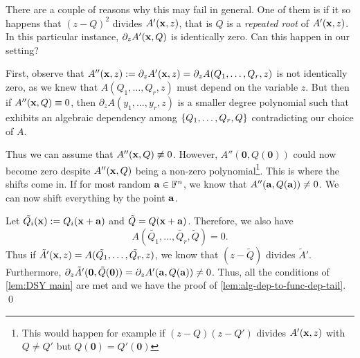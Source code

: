 There are a couple of reasons why this may fail in general.
One of them is if it so happens that $(z-Q)^2$ divides $A'(\mathbf{x}, z)$, that is $Q$ is a \emph{repeated root} of $A'(\mathbf{x}, z)$. In this particular instance, $\partial_z A'(\mathbf{x}, Q)$ is identically zero. Can this happen in our setting? 

First, observe that $A''(\mathbf{x}, z) := \partial_z A'(\mathbf{x}, z) = \partial_z A(Q_1,\ldots, Q_r,z)$ is not identically zero, as we knew that $A(Q_1,\ldots, Q_r,z)$ must depend on the variable $z$. But then if $A''(\mathbf{x}, Q) \equiv 0$, then $\partial_z A(y_1,\ldots, y_r, z)$ is a smaller degree polynomial such that exhibits an algebraic dependency among $\left\{Q_1,\ldots, Q_r, Q\right\}$ contradicting our choice of $A$. 

Thus we can assume that $A''(\mathbf{x}, Q) \not\equiv 0$. However, $A''(\mathbf{0}, Q(\mathbf{0}))$ could now become zero despite $A''(\mathbf{x}, Q)$ being a non-zero polynomial\footnote{This would happen for example if $(z - Q)(z - Q')$ divides $A'(\mathbf{x}, z)$ with $Q \neq Q'$ but $Q(\mathbf{0}) = Q'(\mathbf{0})$}. This is where the shifts come in. If for most random $\mathbf{a} \in \mathbb{F}^n$, we know that $A''(\mathbf{a}, Q(\mathbf{a})) \neq 0$. We can now shift everything by the point $\mathbf{a}$. 

Let $\tilde{Q_i}(\mathbf{x}) := Q_i(\mathbf{x} + \mathbf{a})$ and $\tilde{Q} = Q(\mathbf{x} + \mathbf{a})$. Therefore, we also have
\[
A(\tilde{Q_1}, \ldots, \tilde{Q_r}, \tilde{Q}) = 0.
\]
Thus if $\tilde{A}'(\mathbf{x}, z) = A(\tilde{Q_1},\ldots, \tilde{Q_r}, z)$, we know that $(z - \tilde{Q})$ divides $\tilde{A}'$. Furthermore, $\partial_z\tilde{A}'(\mathbf{0}, \tilde{Q}(\mathbf{0})) = \partial_zA'(\mathbf{\mathbf{a}}, Q(\mathbf{\mathbf{a}})) \neq 0$. Thus, all the conditions of \autoref{lem:DSY main} are met and we have the proof of \autoref{lem:alg-dep-to-func-dep-tail}. \qed{}\\

